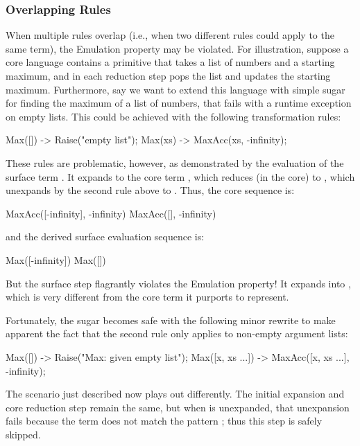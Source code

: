\subsubsection{Overlapping Rules}
\label{sec:reval-overlapping}

When multiple rules overlap (i.e., when two different rules could apply to the same term),
the Emulation property may be violated.
For illustration,
suppose a core language contains a  primitive
that takes a list of numbers and a starting maximum, and in each reduction
step pops the list and updates the starting maximum. Furthermore, say
we want to extend this language with simple sugar for finding the maximum
of a list of numbers, that fails with a runtime exception on empty
lists. This could be achieved with the following transformation rules:
\begin{Codes}
Max([]) -> Raise("empty list");
Max(xs) -> MaxAcc(xs, -infinity);
\end{Codes}

These rules are problematic, however, as demonstrated by the evaluation of
the surface term . It expands to the core term
, which reduces (in the core)
to , which unexpands by the second rule above to
. Thus, the core sequence is:
\begin{Codes}
    MaxAcc([-infinity], -infinity)
\CoreStep MaxAcc([], -infinity)
\end{Codes}
and the derived surface evaluation sequence is:
\begin{Codes}
    Max([-infinity])
\SurfStep Max([])
\end{Codes}

But the  surface step flagrantly violates the Emulation
property! It expands into , which is very
different from the core term  it purports to
represent.

Fortunately, the  sugar becomes safe with the following minor
rewrite to make apparent the fact that the second rule only applies to
non-empty argument lists:
\begin{Codes}
Max([]) -> Raise("Max: given empty list");
Max([x, xs ...]) -> MaxAcc([x, xs ...], -infinity);
\end{Codes}
The scenario just described now plays out differently. The initial
expansion and core reduction step remain the same, but when
 is unexpanded, that unexpansion fails because
the term does not match the  pattern ; thus this step is safely skipped.

